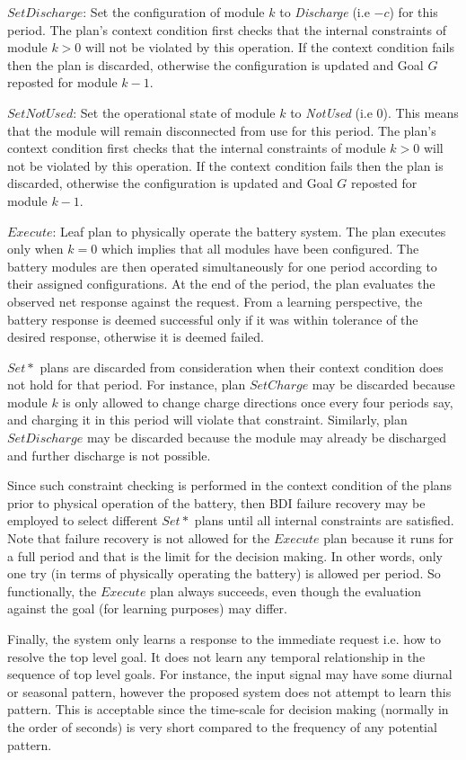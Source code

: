 $SetDischarge$: Set the configuration of module $k$ to {\em Discharge} (i.e $-c$) for this period. The plan's context condition first checks that the internal constraints of module $k>0$ will not be violated by this operation. If the context condition fails then the plan is discarded, otherwise the configuration is updated and Goal $G$ reposted for module $k-1$.

$SetNotUsed$: Set the operational state of module $k$ to {\em NotUsed} (i.e $0$). This means that the module will remain disconnected from use for this period. The plan's context condition first checks that the internal constraints of module $k>0$ will not be violated by this operation. If the context condition fails then the plan is discarded, otherwise the configuration is updated and Goal $G$ reposted for module $k-1$.

$Execute$: Leaf plan to physically operate the battery system. The plan executes only when $k=0$ which implies that all modules have been configured. The battery modules are then operated simultaneously for one period according to their assigned configurations. At the end of the period, the plan evaluates the observed net response against the request. From a learning perspective, the battery response is deemed successful only if it was within tolerance of the desired response, otherwise it is deemed failed.

$Set*$ plans are discarded from consideration when their context condition does not hold for that period. For instance, plan $SetCharge$ may be discarded because module $k$ is only allowed to change charge directions once every four periods say, and charging it in this period will violate that constraint. Similarly, plan $SetDischarge$ may be discarded because the module may already be discharged and further discharge is not possible. 

Since such constraint checking is performed in the context condition of the plans prior to physical operation of the battery, then BDI failure recovery may be employed to select different $Set*$ plans until all internal constraints are satisfied. Note that failure recovery is not allowed for the $Execute$ plan because it runs for a full period and that is the limit for the decision making. In other words, only one try (in terms of physically operating the battery) is allowed per period. So functionally, the $Execute$ plan always succeeds, even though the evaluation against the goal (for learning purposes) may differ.

Finally, the system only learns a response to the immediate request i.e. how to resolve the top level goal. It does not learn any temporal relationship in the sequence of top level goals. For instance, the input signal may have some diurnal or seasonal pattern, however the proposed system does not attempt to learn this pattern. This is acceptable since the time-scale for decision making (normally in the order of seconds) is very short compared to the frequency of any potential pattern.

